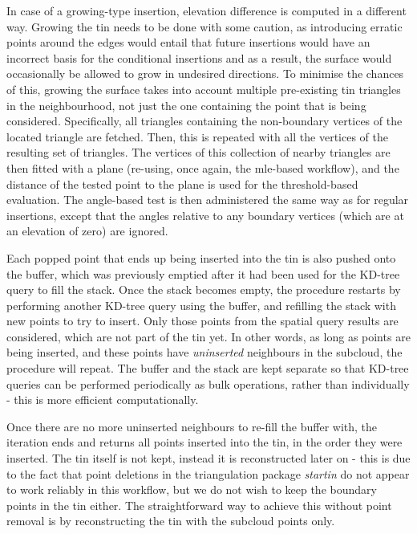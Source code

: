 In case of a growing-type insertion, elevation difference is computed in a different way. Growing the \ac{tin} needs to be done with some caution, as introducing erratic points around the edges would entail that future insertions would have an incorrect basis for the conditional insertions and as a result, the surface would occasionally be allowed to grow in undesired directions. To minimise the chances of this, growing the surface takes into account multiple pre-existing \ac{tin} triangles in the neighbourhood, not just the one containing the point that is being considered. Specifically, all triangles containing the non-boundary vertices of the located triangle are fetched. Then, this is repeated with all the vertices of the resulting set of triangles. The vertices of this collection of nearby triangles are then fitted with a plane (re-using, once again, the \ac{mle}-based workflow), and the distance of the tested point to the plane is used for the threshold-based evaluation. The angle-based test is then administered the same way as for regular insertions, except that the angles relative to any boundary vertices (which are at an elevation of zero) are ignored.

Each popped point that ends up being inserted into the \ac{tin} is also pushed onto the buffer, which was previously emptied after it had been used for the KD-tree query to fill the stack. Once the stack becomes empty, the procedure restarts by performing another KD-tree query using the buffer, and refilling the stack with new points to try to insert. Only those points from the spatial query results are considered, which are not part of the \ac{tin} yet. In other words, as long as points are being inserted, and these points have \textit{uninserted} neighbours in the subcloud, the procedure will repeat. The buffer and the stack are kept separate so that KD-tree queries can be performed periodically as bulk operations, rather than individually - this is more efficient computationally.

Once there are no more uninserted neighbours to re-fill the buffer with, the iteration ends and returns all points inserted into the \ac{tin}, in the order they were inserted. The \ac{tin} itself is not kept, instead it is reconstructed later on - this is due to the fact that point deletions in the triangulation package \textit{startin} do not appear to work reliably in this workflow, but we do not wish to keep the boundary points in the \ac{tin} either. The straightforward way to achieve this without point removal is by reconstructing the \ac{tin} with the subcloud points only.

